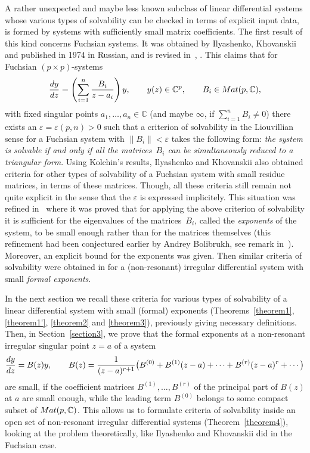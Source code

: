 \documentclass[11pt]{article}
\numberwithin{equation}{section}
\begin{document}
A rather unexpected and maybe less known subclass of linear differential systems whose various types of solvability
can be checked in terms of explicit input data, is formed by systems with sufficiently small matrix coefficients.
The first result of this kind concerns Fuchsian systems. It was obtained by Ilyashenko, Khovanskii and published in
1974 in Russian, and is revised in~\cite{Kh1}, \cite[Chapter~6, Section~2.3]{Kh2}. This claims that for Fuchsian $(p\times p)$-systems
\begin{gather*}
\frac{{\rm d}y}{{\rm d}z}=\left(\sum_{i=1}^n\frac{B_i}{z-a_i}\right)y, \qquad y(z)\in{\mathbb C}^p, \qquad B_i\in{\rm Mat}(p,{\mathbb C}),
\end{gather*}
with fixed singular points $a_1,\ldots,a_n\in\mathbb C$ (and maybe $\infty$, if $\sum\limits_{i=1}^nB_i\ne0$) there exists an
$\varepsilon=\varepsilon(p,n)>0$ such that a criterion of solvability in the Liouvillian sense for a Fuchsian system
with $\|B_i\|<\varepsilon$ takes the following form: {\it the system is solvable if and only if all the matrices~$B_i$ can be
simultaneously reduced to a triangular form}. Using Kolchin's results, Ilyashenko and Khovanskii also obtained criteria for
other types of solvability of a Fuchsian system with small residue matrices, in terms of these matrices. Though, all these
criteria still remain not quite explicit in the sense that the $\varepsilon$ is expressed implicitely. This situation was
refined in~\cite{VG} where it was proved that for applying the above criterion of solvability it is sufficient for the eigenvalues of the matrices~$B_i$, called the {\it exponents} of the system, to be small enough rather than for the matrices themselves (this refinement had been conjectured earlier by Andrey Bolibrukh, see remark in~\cite[Section~6.2.3]{Kh1}). Moreover, an explicit bound for the exponents was given. Then similar criteria of solvability were obtained in \cite{GV} for a (non-resonant) irregular differential system with small {\it formal exponents}.

In the next section we recall these criteria for various types of solvability of a linear differential system with small (formal) exponents (Theorems~\ref{theorem1}, \ref{theorem1'}, \ref{theorem2} and \ref{theorem3}), previously giving necessary definitions. Then, in Section~\ref{section3}, we prove that the formal exponents at a non-resonant irregular singular point $z=a$ of a system
\begin{gather}\label{syst1}
\frac{{\rm d}y}{{\rm d}z}=B(z) y, \qquad B(z)=\frac1{(z-a)^{r+1}}\bigl(B^{(0)}+B^{(1)}(z-a)+\cdots+B^{(r)}(z-a)^r+\cdots\bigr)
\end{gather}
are small, if the coefficient matrices $B^{(1)},\ldots,B^{(r)}$ of the principal part of $B(z)$ at $a$ are small enough, while the leading term $B^{(0)}$ belongs to some compact subset of ${\rm Mat}(p,{\mathbb C})$. This allows us to formulate criteria of solvability inside an open set of non-resonant irregular differential systems (Theorem~\ref{theorem4}), looking at the problem theoretically, like Ilyashenko and Khovanskii did in the Fuchsian case.
\end{document}
